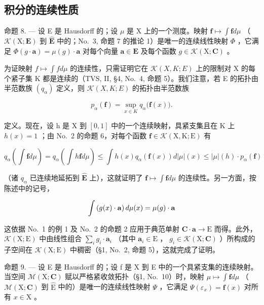 \subsection{积分的连续性质}

命题 8. --- 设 E 是 Hausdorff 的；设 \(\mu\) 是 X 上的一个测度。映射 \(\mathbf{f} \mapsto \int \mathbf{f} d\mu\) （ \(\mathcal{K}(\mathrm{X};\mathbf{E})\) 到 \(\widehat{\mathbf{E}}\) 中的；No.~3, 命题 7 的推论 1）是唯一的连续线性映射 \(\Phi\) ，它满足 \(\Phi(g \cdot \mathbf{a}) = \mu(g) \cdot \mathbf{a}\) 对每个向量 \(\mathbf{a} \in \mathbf{E}\) 及每个函数 \(g \in \mathcal{K}(\mathrm{X};\mathbf{C})\) 。

为证映射 \(f \mapsto \int f d\mu\) 的连续性，只需证明它在 \(\mathcal{K}(X, K; E)\) 上的限制对 X 的每个紧子集 K 都是连续的（TVS, II, §4, No.~4, 命题 5）。我们注意，若 E 的拓扑由半范数族 \((q_{\alpha})\) 定义，则 \(\mathcal{K}(X, K; E)\) 的拓扑由半范数族

\[
p _ {\alpha} (\mathbf {f}) = \sup _ {x \in K} q _ {\alpha} \bigl (\mathbf {f} (x) \bigr).
\]

定义。现在，设 h 是 X 到 \([0,1]\) 中的一个连续映射，具紧支集且在 K 上 \(h(x)=1\) ；由 No.~2 的命题 6，对每个函数 \(\mathbf{f}\in\mathcal{K}(\mathrm{X},\mathrm{K};\mathrm{E})\) 有

\[
q _ {\alpha} \left(\int \mathbf {f} d \mu\right) = q _ {\alpha} \left(\int h \mathbf {f} d \mu\right) \leqslant \int h (x) q _ {\alpha} (\mathbf {f} (x)) d | \mu | (x) \leqslant | \mu | (h) \cdot p _ {\alpha} (\mathbf {f})
\]

（诸 \(q_{\alpha}\) 已连续地延拓到 \(\widehat{\mathbf{E}}\) 上），这就证明了 \(\mathbf{f} \mapsto \int \mathbf{f} d\mu\) 的连续性。另一方面，按陈述中的记号，

\[
\int \left(g (x) \cdot {\bf a}\right) d \mu (x) = \mu (g) \cdot {\bf a}
\]

这依据 No.~1 的例 1 及 No.~2 的命题 2 应用于典范单射 \(\mathbf{C} \cdot \mathbf{a} \to \mathrm{E}\) 而得。此外， \(\mathcal{K}(\mathrm{X};\mathrm{E})\) 中由线性组合 \(\sum_{i} g_i \cdot \mathbf{a}_i\) （其中 \(\mathbf{a}_i \in \mathrm{E}\) ， \(g_i \in \mathcal{K}(\mathrm{X};\mathbf{C})\) ）所构成的子空间在 \(\mathcal{K}(\mathrm{X};\mathrm{E})\) 中稠密（§1, No.~2, 命题 5），这就完成了证明。

命题 9. --- 设 E 是 Hausdorff 的；设 f 是 X 到 E 中的一个具紧支集的连续映射。当空间 \(\mathcal{M}(\mathrm{X};\mathbf{C})\) 赋以严格紧收敛拓扑（§1, No.~10）时，映射 \(\mu \mapsto \int \mathbf{f} d\mu\) （ \(\mathcal{M}(\mathrm{X};\mathbf{C})\) 到 \(\widehat{\mathrm{E}}\) 中的）是唯一的连续线性映射 \(\Psi\) ，它满足 \(\Psi(\varepsilon_x) = \mathbf{f}(x)\) 对所有 \(x \in \mathrm{X}\) 。

